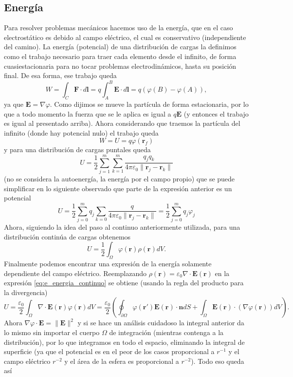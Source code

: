 \documentclass[11pt,a4paper]{article}
\numberwithin{equation}{section}
\begin{document}
\subsection{Energía}
\label{sec:conserva_energia}
Para resolver problemas mecánicos hacemos uso de la energía, que en el caso electrostático es debido al campo eléctrico, el cual es conservativo (independiente del camino). La energía (potencial) de una distribución de cargas la definimos como el trabajo necesario para traer cada elemento desde el infinito, de forma cuasiestacionaria para no tocar problemas electrodinámicos, hasta su posición final. De esa forma, ese trabajo queda \[W = \int_{C} \textbf{F} \cdot d\textbf{l} = q \int_A^B \textbf{E} \cdot d\textbf{l} = q (\varphi(B) - \varphi(A)),\] ya que $\textbf{E} = \nabla \varphi$. Como dijimos se mueve la partícula de forma estacionaria, por lo que a todo momento la fuerza que se le aplica es igual a $q\textbf{E}$ (y entonces el trabajo es igual al presentado arriba). Ahora considerando que traemos la partícula del infinito (donde hay potencial nulo) el trabajo queda
\begin{equation}
    W = U = q \varphi(\textbf{r}_f)
    \label{eq:e_trabajo_particula}
\end{equation}
y para una distribución de cargas puntales queda \[U = \frac{1}{2} \sum_{j = 1}^m \sum_{k = 1}^m \frac{q_j q_k}{4\pi\varepsilon_0\|\textbf{r}_j - \textbf{r}_k\|}\] (no se considera la autoenergía, la energía por el campo propio) que se puede simplificar en lo siguiente observado que parte de la expresión anterior es un potencial
\begin{equation}
    U = \frac{1}{2} \sum_{j = 0}^m q_j \sum_{k = 0} \frac{q}{4\pi\varepsilon_0 \|\textbf{r}_j - \textbf{r}_k\|} = \frac{1}{2} \sum_{j = 0}^m q_j \varphi_j
    \label{eq:e_energia_discreta}
\end{equation}
Ahora, siguiendo la idea del paso al continuo anteriormente utilizada, para una distribución continúa de cargas obtenemos
\begin{equation}
    U = \frac{1}{2} \int_{\Omega} \varphi(\textbf{r}) \rho(\textbf{r}) dV.
    \label{eq:e_energia_continuo}
\end{equation}
Finalmente podemos encontrar una expresión de la energía solamente dependiente del campo eléctrico. Reemplazando $\rho(\textbf{r}) = \varepsilon_0 \nabla \cdot \textbf{E}(\textbf{r})$ en la expresión \ref{eq:e_energia_continuo} se obtiene (usando la regla del producto para la divergencia) \[U = \frac{\varepsilon_0}{2}\int_{\Omega} \nabla \cdot \textbf{E}(\textbf{r}) \varphi(\textbf{r}) dV = \frac{\varepsilon_0}{2}\left(\oint_{\partial \Omega} \varphi(\textbf{r}') \textbf{E}(\textbf{r}) \cdot \textbf{n} dS +  \int_{\Omega} \textbf{E}(\textbf{r}) \cdot (\nabla \varphi(\textbf{r})) dV\right).\] Ahora $\nabla\varphi \cdot \textbf{E} = \|\textbf{E}\|^2$ y si se hace un análisis cuidadoso la integral anterior da lo mismo sin importar el cuerpo $\Omega$ de integración (mientras contenga a la distribución), por lo que integramos en todo el espacio, eliminando la integral de superficie (ya que el potencial es en el peor de los casos proporcional a $r^{-1}$ y el campo eléctrico $r^{-2}$ y el área de la esfera es proporcional a $r^{-2}$). Todo eso queda así
\end{document}
